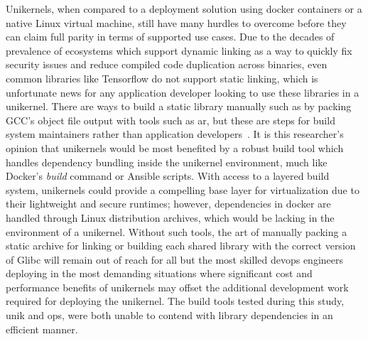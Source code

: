 \documentclass[conference]{IEEEtran}
\begin{document}
Unikernels, when compared to a deployment solution using docker
containers or a native Linux virtual machine, still have many
hurdles to overcome before they can claim full parity in terms of
supported use cases. Due to the decades of prevalence of
ecosystems which support dynamic linking as a way to quickly fix
security issues and reduce compiled code duplication across
binaries, even common libraries like Tensorflow do not support
static linking, which is unfortunate news for any application
developer looking to use these libraries in a unikernel. There
are ways to build a static library manually such as by packing
GCC’s object file output with tools such as ar, but these are
steps for build system maintainers rather than application
developers~\cite{ar}. It is this researcher’s opinion that
unikernels would be most benefited by a robust build tool which
handles dependency bundling inside the unikernel environment,
much like Docker’s \textit{build} command or Ansible scripts.
With access to a layered build system, unikernels could provide a
compelling base layer for virtualization due to their lightweight
and secure runtimes; however, dependencies in docker are handled
through Linux distribution archives, which would be lacking in
the environment of a unikernel.  Without such tools, the art of
manually packing a static archive for linking or building each
shared library with the correct version of Glibc will remain out
of reach for all but the most skilled devops engineers deploying
in the most demanding situations where significant cost and
performance benefits of unikernels may offset the additional
development work required for deploying the unikernel. The build
tools tested during this study, unik and ops, were both unable to
contend with library dependencies in an efficient manner.
\end{document}
